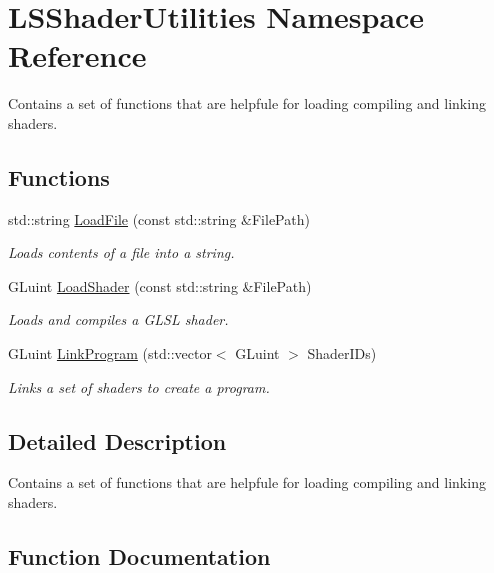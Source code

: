 \hypertarget{namespace_l_s_shader_utilities}{}\section{L\+S\+Shader\+Utilities Namespace Reference}
\label{namespace_l_s_shader_utilities}


Contains a set of functions that are helpfule for loading compiling and linking shaders.  


\subsection*{Functions}
\begin{DoxyCompactItemize}
\item 
std\+::string \hyperlink{namespace_l_s_shader_utilities_ad1e646e21414567daa2167d625bcdba6}{Load\+File} (const std\+::string \&File\+Path)
\begin{DoxyCompactList}\small\item\em Loads contents of a file into a string. \end{DoxyCompactList}\item 
G\+Luint \hyperlink{namespace_l_s_shader_utilities_a1dd5d9b0ace8599c62360f5d4a96132a}{Load\+Shader} (const std\+::string \&File\+Path)
\begin{DoxyCompactList}\small\item\em Loads and compiles a G\+L\+SL shader. \end{DoxyCompactList}\item 
G\+Luint \hyperlink{namespace_l_s_shader_utilities_ab0e4634e03ac53beb004f153b45a61b3}{Link\+Program} (std\+::vector$<$ G\+Luint $>$ Shader\+I\+Ds)
\begin{DoxyCompactList}\small\item\em Links a set of shaders to create a program. \end{DoxyCompactList}\end{DoxyCompactItemize}


\subsection{Detailed Description}
Contains a set of functions that are helpfule for loading compiling and linking shaders. 

\subsection{Function Documentation}
\mbox{\label{namespace_l_s_shader_utilities_ab0e4634e03ac53beb004f153b45a61b3}} 
